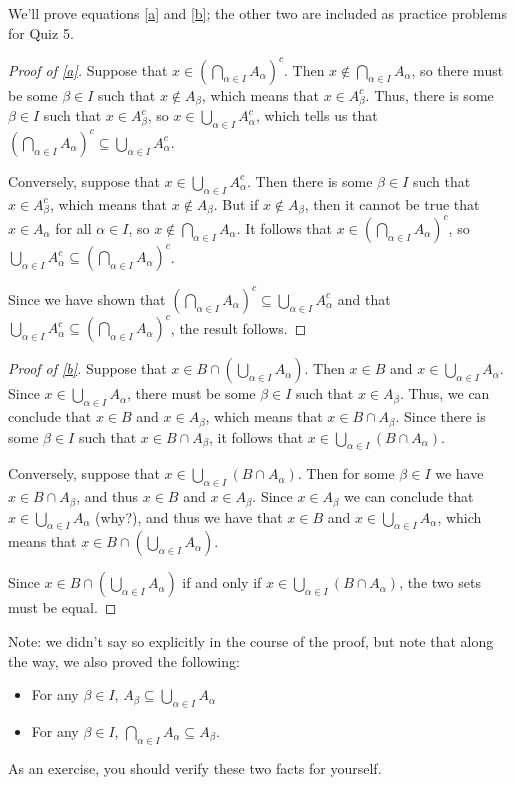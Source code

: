 \documentclass[letterpaper,12pt]{article}
\begin{document}
We'll prove equations \eqref{a} and \eqref{b}; the other two are included as practice problems for Quiz 5.
\begin{proof}[Proof of \eqref{a}]
 Suppose that $x\in \left(\bigcap_{\alpha\in I}A_\alpha\right)^c$. Then $x\notin \bigcap_{\alpha\in I}A_\alpha$, so there must be some $\beta\in I$ such that $x\notin A_\beta$, which means that $x\in A_\beta^c$. Thus, there is some $\beta\in I$ such that $x\in A_\beta^c$, so $x\in \bigcup_{\alpha\in I}A_\alpha^c$, which tells us that $\left(\bigcap_{\alpha\in I}A_\alpha\right)^c\subseteq \bigcup_{\alpha\in I}A_\alpha^c$.

 Conversely, suppose that $x\in \bigcup_{\alpha\in I}A_\alpha^c$. Then there is some $\beta\in I$ such that $x\in A_\beta^c$, which means that $x\notin A_\beta$. But if $x\notin A_\beta$, then it cannot be true that $x\in A_\alpha$ for all $\alpha\in I$, so $x\notin \bigcap_{\alpha\in I}A_\alpha$. It follows that $x\in\left(\bigcap_{\alpha\in I}A_\alpha\right)^c$, so $\bigcup_{\alpha\in I}A_\alpha^c\subseteq \left(\bigcap_{\alpha\in I}A_\alpha\right)^c$.

 Since we have shown that $\left(\bigcap_{\alpha\in I}A_\alpha\right)^c\subseteq \bigcup_{\alpha\in I}A_\alpha^c$ and that $\bigcup_{\alpha\in I}A_\alpha^c\subseteq \left(\bigcap_{\alpha\in I}A_\alpha\right)^c$, the result follows.
\end{proof}
\begin{proof}[Proof of \eqref{b}]
 Suppose that $x\in B\cap\left(\bigcup_{\alpha\in I}A_\alpha\right)$. Then $x\in B$ and $x\in \bigcup_{\alpha\in I}A_\alpha$. Since $x\in \bigcup_{\alpha\in I}A_\alpha$, there must be some $\beta\in I$ such that $x\in A_\beta$. Thus, we can conclude that $x\in B$ and $x\in A_\beta$, which means that $x\in B\cap A_\beta$. Since there is some $\beta\in I$ such that $x\in B\cap A_\beta$, it follows that $x\in \bigcup_{\alpha\in I}(B\cap A_\alpha)$.

 Conversely, suppose that $x\in \bigcup_{\alpha\in I}(B\cap A_\alpha)$. Then for some $\beta\in I$ we have $x\in B\cap A_\beta$, and thus $x\in B$ and $x\in A_\beta$. Since $x\in A_\beta$ we can conclude that $x\in \bigcup_{\alpha\in I}A_\alpha$ (why?), and thus we have that $x\in B$ and $x\in \bigcup_{\alpha\in I}A_\alpha$, which means that $x\in B\cap \left(\bigcup_{\alpha\in I}A_\alpha\right)$. 

 Since $x\in B\cap\left(\bigcup_{\alpha\in I}A_\alpha\right)$ if and only if $x\in \bigcup_{\alpha\in I}(B\cap A_\alpha)$, the two sets must be equal.
\end{proof}
Note: we didn't say so explicitly in the course of the proof, but note that along the way, we also proved the following:
\begin{itemize}
 \item For any $\beta\in I$, $A_\beta\subseteq \bigcup_{\alpha\in I}A_\alpha$
 \item For any $\beta\in I$, $\bigcap_{\alpha\in I}A_\alpha \subseteq A_\beta$.
\end{itemize}
As an exercise, you should verify these two facts for yourself.
\end{document}

